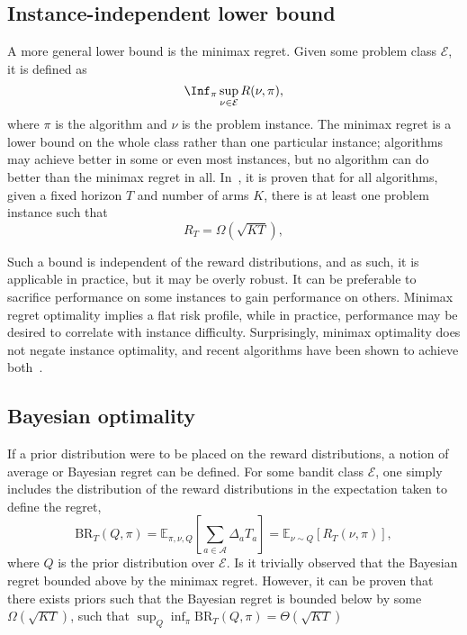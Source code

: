 \subsection{Instance-independent lower bound}
A more general lower bound is the minimax regret.
Given some problem class $\mathcal{E}$, it is defined as
\begin{equation}
    \Inf_{\pi} \sup_{\nu \in \mathcal{E}} R(\nu, \pi),
\end{equation}
where $\pi$ is the algorithm and $\nu$ is the problem instance.
The minimax regret is a lower bound on the whole class rather than one particular instance; algorithms may achieve better in some or even most instances, but no algorithm can do better than the minimax regret in all.
In~\autocite{auer2002a}, it is proven that for all algorithms, given a fixed horizon $T$ and number of arms $K$, there is at least one problem instance such that
\begin{equation}
    R_T = \Omega(\sqrt{KT}),
\end{equation}

Such a bound is independent of the reward distributions, and as such, it is applicable in practice, but it may be overly robust.
It can be preferable to sacrifice performance on some instances to gain performance on others.
Minimax regret optimality implies a flat risk profile, while in practice, performance may be desired to correlate with instance difficulty.
Surprisingly, minimax optimality does not negate instance optimality, and recent algorithms have been shown to achieve both~\autocite{menard2017, jin2020}.


\subsection{Bayesian optimality}
\label{sec:bayesian-optimality}
If a prior distribution were to be placed on the reward distributions, a notion of average or Bayesian regret can be defined.
For some bandit class $\mathcal{E}$, one simply includes the distribution of the reward distributions in the expectation taken to define the regret,
\begin{equation}
    \text{BR}_T(Q, \pi)
    = \mathbb{E}_{\pi, \nu, Q} \left[ \sum_{a \in \mathcal{A}} \Delta_a T_a \right]
    = \mathbb{E}_{\nu \sim Q} \left[R_T(\nu, \pi) \right],
\end{equation}
where $Q$ is the prior distribution over $\mathcal{E}$.
Is it trivially observed that the Bayesian regret bounded above by the minimax regret.
However, it can be proven that there exists priors such that the Bayesian regret is bounded below by some $\Omega(\sqrt{KT})$, such that $\sup_{Q} \inf_{\pi} \text{BR}_T(Q, \pi) = \Theta(\sqrt{KT})$~\autocite{lattimore2020}

